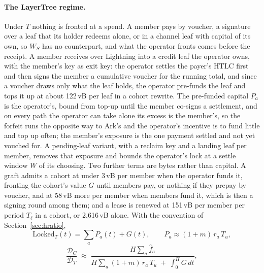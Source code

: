 \documentclass[11pt]{article}
\theoremstyle{plain}
\theoremstyle{definition}
\theoremstyle{remark}
\newcommand{\Dur}{\mathcal{D}}
\begin{document}
\paragraph{The LayerTree regime.} Under $T$ nothing is fronted at a spend. A member pays by voucher, a signature over a leaf that its holder redeems alone, or in a channel leaf with capital of its own, so $W_S$ has no counterpart, and what the operator fronts comes before the receipt. A member receives over Lightning into a credit leaf the operator owns, with the member's key as exit key: the operator settles the payer's HTLC first and then signs the member a cumulative voucher for the running total, and since a voucher draws only what the leaf holds, the operator pre-funds the leaf and tops it up at about 122\,vB per leaf in a cohort rewrite. The pre-funded capital $P_a$ is the operator's, bound from top-up until the member co-signs a settlement, and on every path the operator can take alone its excess is the member's, so the forfeit runs the opposite way to Ark's and the operator's incentive is to fund little and top up often; the member's exposure is the one payment settled and not yet vouched for. A pending-leaf variant, with a reclaim key and a landing leaf per member, removes that exposure and bounds the operator's lock at a settle window $W$ of its choosing. Two further terms are bytes rather than capital. A graft admits a cohort at under 3\,vB per member when the operator funds it, fronting the cohort's value $G$ until members pay, or nothing if they prepay by voucher, and at 58\,vB more per member when members fund it, which is then a signing round among them; and a lease is renewed at 151\,vB per member per period $T_\ell$ in a cohort, or 2{,}616\,vB alone. With the convention of Section~\ref{sec:hratio},
\begin{equation}
\mathrm{Locked}_T(t)=\sum_a P_a(t)+G(t),\qquad P_a\approx(1+m)\,r_a\,T_u,
\end{equation}
\begin{equation}
\frac{\Dur_C}{\Dur_T}\;\approx\;\frac{H\sum_a\hat f_a}{H\sum_a(1+m)\,r_a\,T_u\;+\;\int_0^H G\,dt},
\label{eq:tratio}
\end{equation}
\end{document}
